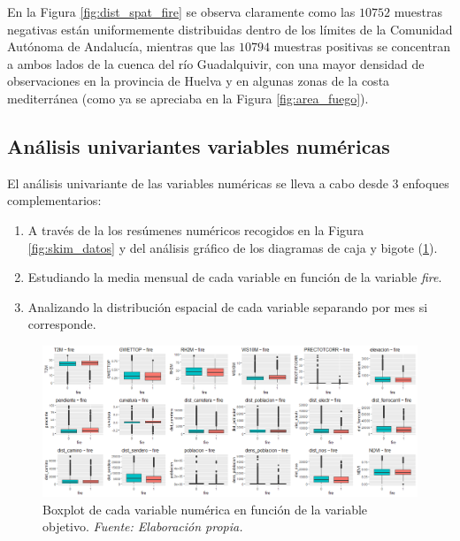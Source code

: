 \documentclass[12pt,a4paper,]{book}
\numberwithin{dummy}{section}
\theoremstyle{ocrenumbox}
\theoremstyle{blacknumex}
\theoremstyle{blacknumbox}
\theoremstyle{ocrenum}
\theoremstyle{ocrenum}
\begin{document}
En la Figura \ref{fig:dist_spat_fire} se observa claramente como las
\(10752\) muestras negativas están uniformemente distribuidas dentro de
los límites de la Comunidad Autónoma de Andalucía, mientras que las
\(10794\) muestras positivas se concentran a ambos lados de la cuenca
del río Guadalquivir, con una mayor densidad de observaciones en la
provincia de Huelva y en algunas zonas de la costa mediterránea (como ya
se apreciaba en la Figura \ref{fig:area_fuego}).

\hypertarget{anuxe1lisis-univariantes-variables-numuxe9ricas}{%
\subsection{Análisis univariantes variables
numéricas}\label{anuxe1lisis-univariantes-variables-numuxe9ricas}}

El análisis univariante de las variables numéricas se lleva a cabo desde
3 enfoques complementarios:

\begin{enumerate}
\def\labelenumi{\arabic{enumi}.}
\item
  A través de la los resúmenes numéricos recogidos en la Figura
  \ref{fig:skim_datos} y del análisis gráfico de los diagramas de caja y
  bigote (\ref{fig:boxplots}).
\item
  Estudiando la media mensual de cada variable en función de la variable
  \emph{fire}.
\item
  Analizando la distribución espacial de cada variable separando por mes
  si corresponde.
\end{enumerate}

\begin{figure}[]
\centering
\includegraphics[width =\textwidth]{graficos/boxplots.png}
\caption{Boxplot de cada variable numérica en función de la variable objetivo. \it Fuente: Elaboración propia.}
\label{fig:boxplots}
\end{figure}
\end{document}
